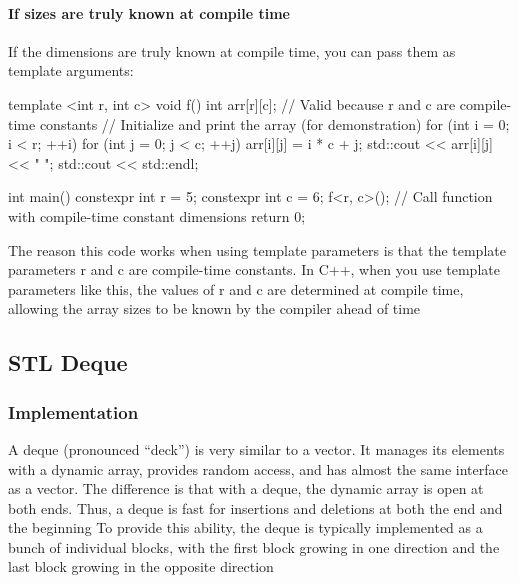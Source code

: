 \documentclass{report}
\begin{document}
    \pagebreak \bigbreak \noindent 
    \paragraph{If sizes are truly known at compile time}
    \bigbreak \noindent \bigbreak \noindent 
    If the dimensions are truly known at compile time, you can pass them as template arguments:
    \bigbreak \noindent 
    \begin{cppcode}
        template <int r, int c>
        void f() {
            int arr[r][c];  // Valid because r and c are compile-time constants
            // Initialize and print the array (for demonstration)
            for (int i = 0; i < r; ++i) {
                for (int j = 0; j < c; ++j) {
                    arr[i][j] = i * c + j;
                    std::cout << arr[i][j] << " ";
                }
                std::cout << std::endl;
            }
        }

        int main() {
            constexpr int r = 5;
            constexpr int c = 6;
            f<r, c>();  // Call function with compile-time constant dimensions
            return 0;
        }
    \end{cppcode}
    \bigbreak \noindent 
    The reason this code works when using template parameters is that the template parameters r and c are compile-time constants. In C++, when you use template parameters like this, the values of r and c are determined at compile time, allowing the array sizes to be known by the compiler ahead of time









    \pagebreak 
    \subsection{STL Deque}
    \bigbreak \noindent 
    \subsubsection{Implementation}
    \bigbreak \noindent 
    A deque (pronounced “deck”) is very similar to a vector. It manages its elements with a dynamic
    array, provides random access, and has almost the same interface as a vector. The difference is
    that with a deque, the dynamic array is open at both ends. Thus, a deque is fast for insertions and
    deletions at both the end and the beginning
    \bigbreak \noindent 
    To provide this ability, the deque is typically implemented as a bunch of individual blocks, with the
    first block growing in one direction and the last block growing in the opposite direction
\end{document}
